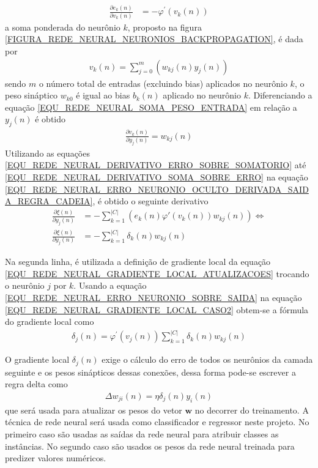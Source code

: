 \begin{align}
\frac{\partial e_{k}(n)}{\partial v_{k}(n)} &= -\varphi^{'}(v_{k}(n))	\label{EQU_REDE_NEURAL_DERIVATIVO_ERRO_SOBRE_SOMATORIO}	   
\end{align}
a soma ponderada do neurônio \(k\), proposto na figura \ref{FIGURA_REDE_NEURAL_NEURONIOS_BACKPROPAGATION}, é dada por
\begin{align}
v_{k}(n) = \sum\limits_{j = 0}^{m} \left( w_{kj}(n)y_{j}(n) \right)  \label{EQU_REDE_NEURAL_SOMA_PESO_ENTRADA}
\end{align}
sendo \(m\) o número total de entradas (excluindo bias) aplicados no neurônio \(k\), o peso sináptico \(w_{k0}\) é igual ao bias \(b_{k}(n)\) aplicado no neurônio \(k\). Diferenciando a equação \eqref{EQU_REDE_NEURAL_SOMA_PESO_ENTRADA} em relação a \(y_{j}(n)\) é obtido
\begin{align}
\frac{\partial v_{k}(n)}{\partial y_{j}(n)} = w_{kj}(n) \label{EQU_REDE_NEURAL_DERIVATIVO_SOMA_SOBRE_ERRO}
\end{align}
Utilizando as equações \eqref{EQU_REDE_NEURAL_DERIVATIVO_ERRO_SOBRE_SOMATORIO} até \eqref{EQU_REDE_NEURAL_DERIVATIVO_SOMA_SOBRE_ERRO} na equação \eqref{EQU_REDE_NEURAL_ERRO_NEURONIO_OCULTO_DERIVADA_SAIDA_REGRA_CADEIA}, é obtido o seguinte derivativo
\begin{align}
\frac{\partial \xi(n)}{\partial y_{j}(n)} &= -\sum\limits_{k = 1}^{|C|} \left( e_{k}(n)\varphi{'}(v_{k}(n))w_{kj}(n) \right) \Leftrightarrow \\
\frac{\partial \xi(n)}{\partial y_{j}(n)} &= -\sum\limits_{k = 1}^{|C|}\delta_{k}(n)w_{kj}(n) \label{EQU_REDE_NEURAL_ERRO_NEURONIO_SOBRE_SAIDA}
\end{align}

Na segunda linha, é utilizada a definição de gradiente local da equação \eqref{EQU_REDE_NEURAL_GRADIENTE_LOCAL_ATUALIZACOES} trocando o neurônio \(j\) por \(k\). Usando a equação \eqref{EQU_REDE_NEURAL_ERRO_NEURONIO_SOBRE_SAIDA} na equação \eqref{EQU_REDE_NEURAL_GRADIENTE_LOCAL_CASO2} obtem-se a fórmula do gradiente local como
\begin{align}
\delta_{j}(n) = \varphi^{'}(v_{j}(n)) \sum\limits_{k = 1}^{|C|}\delta_{k}(n)w_{kj}(n)
\end{align}

O gradiente local \(\delta_{j}(n)\) exige o cálculo do erro de todos os neurônios da camada seguinte e os pesos sinápticos dessas conexões, dessa forma pode-se escrever a regra delta como
\begin{align}
\Delta w_{ji}(n) = \eta \delta_{j}(n)y_{i}(n) \label{EQU_REGRA_DELTA}
\end{align}
que será usada para atualizar os pesos do vetor \(\mathbf{w}\) no decorrer do treinamento. A técnica de rede neural será usada como classificador e regressor neste projeto. No primeiro caso são usadas as saídas da rede neural para atribuir classes as instâncias. No segundo caso são usados os pesos da rede neural treinada para predizer valores numéricos.

